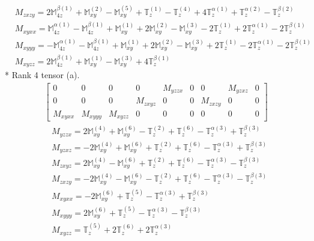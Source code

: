 \documentclass[fleqn,8pt,landscape]{jsarticle}
\begin{document}
\begin{align*}
& M_{zxzy} = 2 \mathbb{M}_{4z}^{\beta(1)} + \mathbb{M}_{xy}^{(2)} - \mathbb{M}_{xy}^{(5)} + \mathbb{T}_{z}^{(1)} - \mathbb{T}_{z}^{(4)} + 4 \mathbb{T}_{z}^{\alpha(1)} + \mathbb{T}_{z}^{\alpha(2)} - \mathbb{T}_{z}^{\beta(2)} \\
& M_{xyxx} = \mathbb{M}_{4z}^{\alpha(1)} - \mathbb{M}_{4z}^{\beta(1)} + \mathbb{M}_{xy}^{(1)} + 2 \mathbb{M}_{xy}^{(2)} - \mathbb{M}_{xy}^{(3)} - 2 \mathbb{T}_{z}^{(1)} + 2 \mathbb{T}_{z}^{\alpha(1)} - 2 \mathbb{T}_{z}^{\beta(1)} \\
& M_{xyyy} = - \mathbb{M}_{4z}^{\alpha(1)} - \mathbb{M}_{4z}^{\beta(1)} + \mathbb{M}_{xy}^{(1)} + 2 \mathbb{M}_{xy}^{(2)} - \mathbb{M}_{xy}^{(3)} + 2 \mathbb{T}_{z}^{(1)} - 2 \mathbb{T}_{z}^{\alpha(1)} - 2 \mathbb{T}_{z}^{\beta(1)} \\
& M_{xyzz} = 2 \mathbb{M}_{4z}^{\beta(1)} + \mathbb{M}_{xy}^{(1)} - \mathbb{M}_{xy}^{(3)} + 4 \mathbb{T}_{z}^{\beta(1)}
\end{align*}
* Rank 4 tensor (a).
\begin{align*}
\begin{bmatrix} 0 & 0 & 0 & 0 & M_{yzzx} & 0 & 0 & M_{yzxz} & 0 \\ 0 & 0 & 0 & M_{zxyz} & 0 & 0 & M_{zxzy} & 0 & 0 \\ M_{xyxx} & M_{xyyy} & M_{xyzz} & 0 & 0 & 0 & 0 & 0 & 0 \end{bmatrix}
\end{align*}
\begin{align*}
& M_{yzzx} = 2 \mathbb{M}_{xy}^{(4)} + \mathbb{M}_{xy}^{(6)} - \mathbb{T}_{z}^{(2)} + \mathbb{T}_{z}^{(6)} - \mathbb{T}_{z}^{\alpha(3)} + \mathbb{T}_{z}^{\beta(3)} \\
& M_{yzxz} = - 2 \mathbb{M}_{xy}^{(4)} + \mathbb{M}_{xy}^{(6)} + \mathbb{T}_{z}^{(2)} + \mathbb{T}_{z}^{(6)} - \mathbb{T}_{z}^{\alpha(3)} + \mathbb{T}_{z}^{\beta(3)} \\
& M_{zxyz} = 2 \mathbb{M}_{xy}^{(4)} - \mathbb{M}_{xy}^{(6)} + \mathbb{T}_{z}^{(2)} + \mathbb{T}_{z}^{(6)} - \mathbb{T}_{z}^{\alpha(3)} - \mathbb{T}_{z}^{\beta(3)} \\
& M_{zxzy} = - 2 \mathbb{M}_{xy}^{(4)} - \mathbb{M}_{xy}^{(6)} - \mathbb{T}_{z}^{(2)} + \mathbb{T}_{z}^{(6)} - \mathbb{T}_{z}^{\alpha(3)} - \mathbb{T}_{z}^{\beta(3)} \\
& M_{xyxx} = - 2 \mathbb{M}_{xy}^{(6)} + \mathbb{T}_{z}^{(5)} - \mathbb{T}_{z}^{\alpha(3)} + \mathbb{T}_{z}^{\beta(3)} \\
& M_{xyyy} = 2 \mathbb{M}_{xy}^{(6)} + \mathbb{T}_{z}^{(5)} - \mathbb{T}_{z}^{\alpha(3)} - \mathbb{T}_{z}^{\beta(3)} \\
& M_{xyzz} = \mathbb{T}_{z}^{(5)} + 2 \mathbb{T}_{z}^{(6)} + 2 \mathbb{T}_{z}^{\alpha(3)}
\end{align*}
\end{document}
